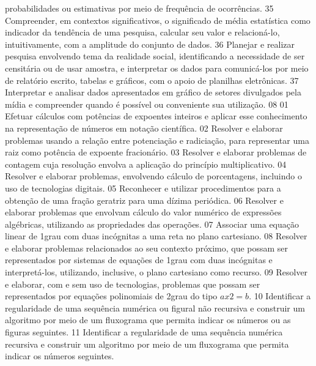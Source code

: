 {{{				probabilidades ou estimativas por meio de frequência de ocorrências.
			}
			{35}{%
				Compreender, em contextos significativos, o significado de média estatística como
				indicador da tendência de uma pesquisa, calcular seu valor e relacioná-lo, intuitivamente, com a
				amplitude do conjunto de dados.
			}
			{36}{%
				Planejar e realizar pesquisa envolvendo tema da realidade social, identificando a
				necessidade de ser censitária ou de usar amostra, e interpretar os dados para comunicá-los por
				meio de relatório escrito, tabelas e gráficos, com o apoio de planilhas eletrônicas.
			}
			{37}{%
				Interpretar e analisar dados apresentados em gráfico de setores divulgados pela
				mídia e compreender quando é possível ou conveniente sua utilização.
			}
	}
	{08}{%
		{01}{%
				Efetuar cálculos com potências de expoentes inteiros e aplicar esse conhecimento
				na representação de números em notação científica.
			}
			{02}{%
				Resolver e elaborar problemas usando a relação entre potenciação e radiciação,
				para representar uma raiz como potência de expoente fracionário.
			}
			{03}{%
				Resolver e elaborar problemas de contagem cuja resolução envolva a aplicação
				do princípio multiplicativo.
			}
			{04}{%
				Resolver e elaborar problemas, envolvendo cálculo de porcentagens, incluindo o
				uso de tecnologias digitais.
			}
			{05}{%
				Reconhecer e utilizar procedimentos para a obtenção de uma fração geratriz
				para uma dízima periódica.
			}
			{06}{%
				Resolver e elaborar problemas que envolvam cálculo do valor numérico de
				expressões algébricas, utilizando as propriedades das operações.
			}
			{07}{%
				Associar uma equação linear de 1\textordmasculine grau com duas incógnitas a uma reta no plano
				cartesiano.
			}
			{08}{%
				Resolver e elaborar problemas relacionados ao seu contexto próximo, que
				possam ser representados por sistemas de equações de 1\textordmasculine grau com duas incógnitas e
				interpretá-los, utilizando, inclusive, o plano cartesiano como recurso.
			}
			{09}{%
				Resolver e elaborar, com e sem uso de tecnologias, problemas que possam ser
				representados por equações polinomiais de 2\textordmasculine grau do tipo \(ax2 = b\).
			}
			{10}{%
				Identificar a regularidade de uma sequência numérica ou figural não recursiva
				e construir um algoritmo por meio de um fluxograma que permita indicar os números ou as
				figuras seguintes.
			}
			{11}{%
				Identificar a regularidade de uma sequência numérica recursiva e construir um
				algoritmo por meio de um fluxograma que permita indicar os números seguintes.
}}}
